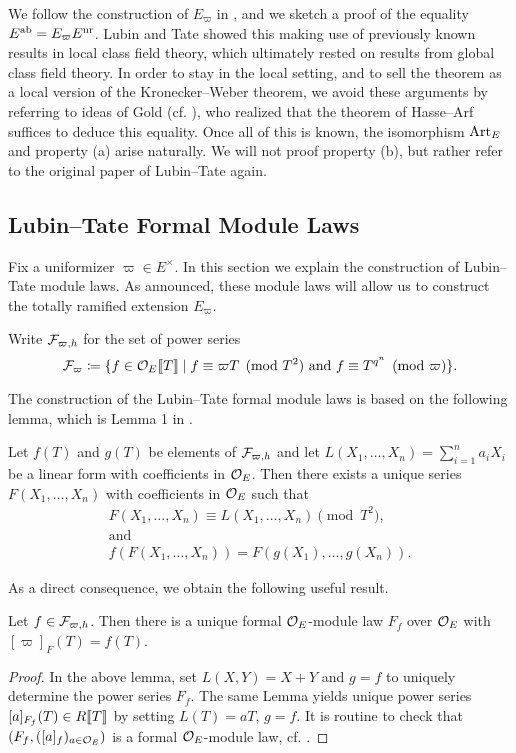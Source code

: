 \documentclass[../main.tex]{subfiles}
\begin{document}
We follow the construction of $E_\varpi$ in \cite{LubinTateFormalMult}, and we sketch
a proof of the equality $E^{\mathrm{ab}} = E_\varpi E^{\mathrm{nr}}$. Lubin and Tate showed this
making use of previously known results in local class field theory, which ultimately
rested on results from global class field theory. 
In order to stay in the local setting, and to sell the theorem as a
local version of the Kronecker--Weber theorem,
we avoid these arguments by referring to ideas of Gold (cf.
\cite{gold1981local}), who realized that the theorem of Hasse--Arf
suffices to deduce this equality. 
Once all of this is known, the isomorphism $\mathrm{Art}_E$ and property
(a) arise naturally. We will not proof property (b), but rather refer to the original
paper of Lubin--Tate again.

\subsection{Lubin--Tate Formal Module Laws} %
\label{sub:Lubin--Tate Formal Module Laws}
Fix a uniformizer $\varpi \in E^\times$. In this section we explain the construction
of Lubin--Tate module laws. As announced, these module laws will allow us to
construct the totally ramified extension $E_\varpi$.

Write $\mathcal{F}_{\varpi, h}$ for the set of power series
\begin{equation*}
  \mathcal{F}_\varpi \coloneqq \{f \in \mathcal{O}_E \llbracket T \rrbracket \mid f \equiv \varpi T \pmod {T^2}
  \text{ and } f \equiv T^{q^n} \pmod \varpi\}. 
\end{equation*}

The construction of the Lubin--Tate formal module laws is based on the following 
lemma, which is Lemma 1 in \cite{LubinTateFormalMult}.
\begin{lem}\label{lem:LTLemma1}
  Let $f(T)$ and $g(T)$ be elements of $\mathcal{F}_{\varpi,h}$ and let 
  $L(X_1, \dots, X_n) = \sum_{i=1}^n a_i X_i$ be a linear form with coefficients in 
  ${\mathcal{O}_E}$. Then there exists a unique series $F(X_1, \dots, X_n)$ with coefficients 
  in ${\mathcal{O}_E}$ such that 
  \begin{gather*}
    F(X_1, \dots, X_n) \equiv L(X_1, \dots, X_n) \pmod {T^2}, \\ \text{and} \\
    f(F(X_1, \dots, X_n)) = F(g(X_1), \dots, g(X_n)).
  \end{gather*}
\end{lem}

As a direct consequence, we obtain the following useful result.
\begin{lem}
  Let $f \in \mathcal{F}_{\varpi, h}$. Then there is a unique formal ${\mathcal{O}_E}$-module law $F_f$ over ${\mathcal{O}_E}$
  with $[\varpi]_F(T) = f(T)$.
\begin{proof}
  In the above lemma, set $L(X,Y) = X+Y$ and $g=f$ to uniquely determine 
  the power series $F_f$. The same Lemma yields unique power series
  $[a]_{F_f}(T) \in R\llbracket T \rrbracket$ by setting $L(T) = a T$, $g=f$. It is
  routine to check that $(F_f, ([a]_f)_{a \in {\mathcal{O}_E}})$ is a formal ${\mathcal{O}_E}$-module law, 
  cf. \cite{LubinTateFormalMult}.
\end{proof}
\end{lem}
\end{document}
